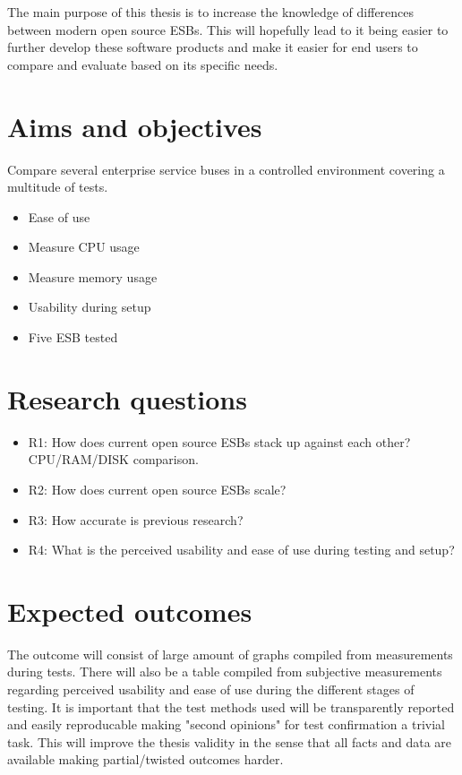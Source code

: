 \documentclass[10pt,a4paper]{proposal}
\begin{document}
The main purpose of this thesis is to increase the knowledge of differences between modern open source ESBs. This will hopefully lead to it being easier to further develop these software products and make it easier for end users to compare and evaluate based on its specific needs.


\section*{Aims and objectives}
Compare several enterprise service buses in a controlled environment covering a multitude of tests.

\begin{itemize}
	\item Ease of use
	\item Measure CPU usage
	\item Measure memory usage
	\item Usability during setup
	\item  Five ESB tested
\end{itemize}


\section*{Research questions}
\begin{itemize}
	\item R1: How does current open source ESBs stack up against each other? CPU/RAM/DISK comparison.
	\item R2: How does current open source ESBs scale?
	\item R3: How accurate is previous research? 
	\item R4: What is the perceived usability and ease of use during testing and setup?
\end{itemize}


\section*{Expected outcomes}
The outcome will consist of large amount of graphs compiled from measurements during tests. There will also be a table compiled from subjective measurements regarding perceived usability and ease of use during the different stages of testing.
It is important that the test methods used will be transparently reported and easily reproducable making "second opinions" for test confirmation a trivial task. This will improve the thesis validity in the sense that all facts and data are available making partial/twisted outcomes harder.
\end{document}
